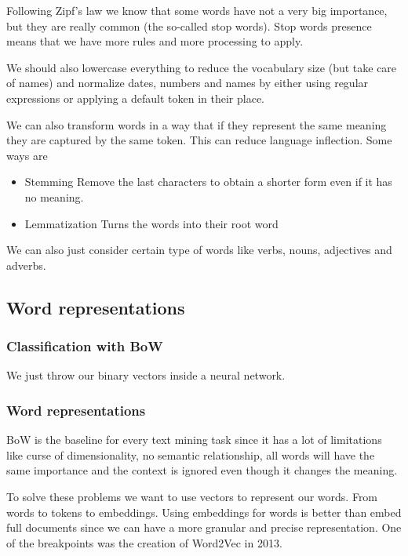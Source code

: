 \vspace{10pt}

Following Zipf's law we know that some words have not a very big importance, but they are really common (the so-called stop words). Stop words presence means that we have more rules and more processing to apply. 

We should also lowercase everything to reduce the vocabulary size (but take care of names) and normalize dates, numbers and names by either using regular expressions or applying a default token in their place.

\vspace{10pt}

We can also transform words in a way that if they represent the same meaning they are captured by the same token. This can reduce language inflection.
Some ways are

\begin{itemize}
    \item Stemming \ra Remove the last characters to obtain a shorter form even if it has no meaning.
    \item Lemmatization \ra Turns the words into their root word
\end{itemize}

We can also just consider certain type of words like verbs, nouns, adjectives and adverbs. 

\subsection{Word representations}

\subsubsection{Classification with BoW}

We just throw our binary vectors inside a neural network. 

\subsubsection{Word representations}

BoW is the baseline for every text mining task since it has a lot of limitations like curse of dimensionality, no semantic relationship, all words will have the same importance and the context is ignored even though it changes the meaning.

To solve these problems we want to use vectors to represent our words. From words to tokens to embeddings. Using embeddings for words is better than embed full documents since we can have a more granular and precise representation. One of the breakpoints was the creation of Word2Vec in 2013.

